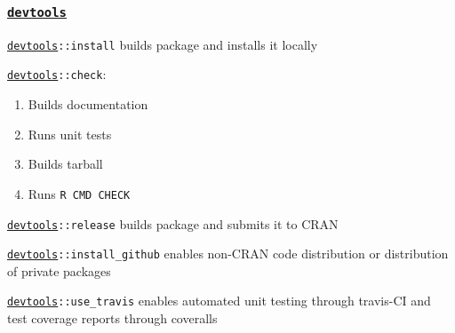 \documentclass[12 pt]{beamer}\usepackage[]{graphicx}\usepackage[]{color}
\newcommand{\hlkwd}[1]{\textcolor[rgb]{0.78,0.227,0.412}{#1}}%
\newcommand{\mxkwd}[1]{\texttt{\hlkwd{#1}}}%
\newcommand{\pkg}[1]{{\fontseries{b}\selectfont #1}}
\renewcommand{\pkg}[1]{{\color{darkgreen}\texttt{#1}}}
\begin{document}

  \begin{frame}[fragile]
\frametitle{\href{http://cran.r-project.org/web/packages/devtools/index.html}{\pkg{devtools}}}

\href{http://cran.r-project.org/web/packages/devtools/index.html}{\pkg{devtools}}{\tt ::\mxkwd{install}} builds package and installs it locally

\vspace{.1in}

\href{http://cran.r-project.org/web/packages/devtools/index.html}{\pkg{devtools}}{\tt ::\mxkwd{check}}:
\begin{enumerate}
  \item  Builds documentation
  \item Runs unit tests
  \item Builds tarball
  \item Runs {\tt R CMD CHECK}
\end{enumerate}

\vspace{.1in}

\href{http://cran.r-project.org/web/packages/devtools/index.html}{\pkg{devtools}}{\tt ::\mxkwd{release}} builds package and submits it to CRAN

\vspace{.1in}

\href{http://cran.r-project.org/web/packages/devtools/index.html}{\pkg{devtools}}{\tt ::\mxkwd{install\_github}} enables non-CRAN code distribution or distribution of private packages

\vspace{.1in}

\href{http://cran.r-project.org/web/packages/devtools/index.html}{\pkg{devtools}}{\tt ::\mxkwd{use\_travis}} enables automated unit testing through travis-CI and test coverage reports through coveralls

\end{frame}




\end{document}
